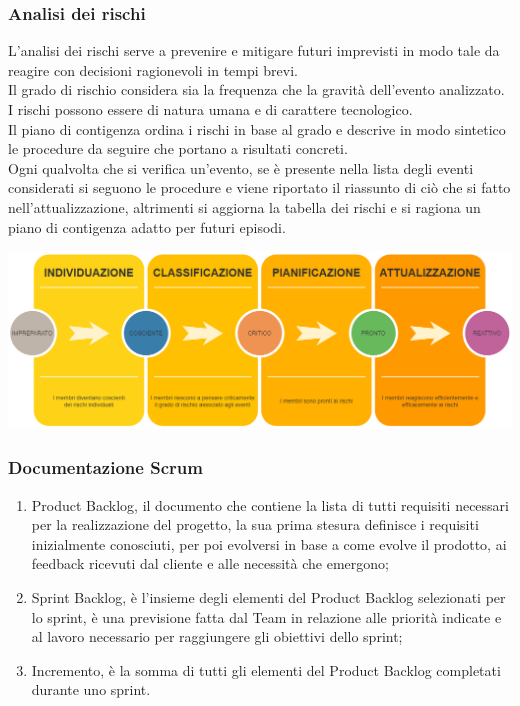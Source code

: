 \subsubsection{Analisi dei rischi}

L'analisi dei rischi serve a prevenire e mitigare futuri imprevisti in modo tale da reagire con decisioni ragionevoli in tempi brevi.\\
Il grado di rischio considera sia la frequenza che la gravità dell'evento analizzato.\\
I rischi possono essere di natura umana e di carattere tecnologico.\\
Il piano di contigenza ordina i rischi in base al grado e descrive in modo sintetico le procedure da seguire che portano a risultati concreti.\\
Ogni qualvolta che si verifica un'evento, se è presente nella lista degli eventi considerati si seguono le procedure e viene riportato il riassunto di ciò che si fatto nell'attualizzazione, altrimenti si aggiorna la tabella dei rischi e si ragiona un piano di contigenza adatto per futuri episodi.\\

\begin{center}
\includegraphics[scale=0.3]{img/analisi_rischi.png}
\end{center}

\subsubsection{Documentazione Scrum}
\begin{enumerate}
    \item Product Backlog, il documento che contiene la lista di tutti requisiti necessari per la realizzazione del progetto, la sua prima stesura definisce i requisiti inizialmente conosciuti, per poi evolversi in base a come evolve il prodotto, ai feedback ricevuti dal cliente e alle necessità che emergono; 
    \item Sprint Backlog, è l’insieme degli elementi del Product Backlog selezionati per lo sprint, è una previsione fatta dal Team in relazione alle priorità indicate e al lavoro necessario per raggiungere gli obiettivi dello sprint; 
    \item Incremento, è la somma di tutti gli elementi del Product Backlog completati durante uno sprint.
\end{enumerate}

